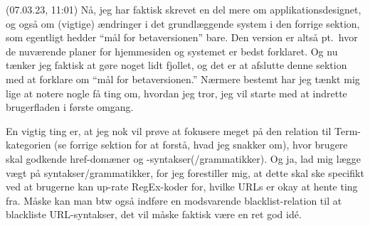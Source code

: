 \documentclass{report}
\begin{document}


(07.03.23, 11:01) Nå, jeg har faktisk skrevet en del mere om applikationsdesignet, og også om (vigtige) ændringer i det grundlæggende system i den forrige sektion, som egentligt hedder ``mål for betaversionen'' bare. Den version er altså pt.\ hvor de nuværende planer for hjemmesiden og systemet er bedst forklaret. Og nu tænker jeg faktisk at gøre noget lidt fjollet, og det er at afslutte denne sektion med at forklare om ``mål for betaversionen.'' Nærmere bestemt har jeg tænkt mig lige at notere nogle få ting om, hvordan jeg tror, jeg vil starte med at indrette brugerfladen i første omgang.

En vigtig ting er, at jeg nok vil prøve at fokusere meget på den relation til Term-kategorien (se forrige sektion for at forstå, hvad jeg snakker om), hvor brugere skal godkende href-domæner og -syntakser(/grammatikker). Og ja, lad mig lægge vægt på syntakser/grammatikker, for jeg forestiller mig, at dette skal ske specifikt ved at brugerne kan up-rate RegEx-koder for, hvilke URLs er okay at hente ting fra. Måske kan man btw også indføre en modsvarende blacklist-relation til at blackliste URL-syntakser, det vil måske faktisk være en ret god idé. 
\end{document}
